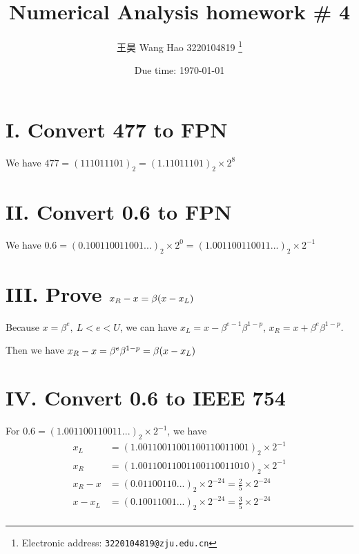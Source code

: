 \documentclass[a4paper]{article}
\begin{document}
\title{Numerical Analysis homework \# 4}

\author{王昊 Wang Hao 3220104819
  \thanks{Electronic address: \texttt{3220104819@zju.edu.cn}}}


\date{Due time: \today}

\maketitle


\section*{I. Convert 477 to FPN}

We have $477 = (111011101)_2 = (1.11011101)_2 \times 2^8$

\section*{II. Convert 0.6 to FPN}

We have $0.6 = (0.100110011001...)_2 \times 2^0 = (1.001100110011...)_2 \times 2^{-1}$

\section*{III. Prove $x_R - x = \beta \qty(x-x_L)$}

Because $x = \beta^e, ~ L<e<U$, we can have $x_L = x - \beta^{e-1} \beta^{1-p}$, $x_R = x + \beta^e \beta^{1-p}$. 

Then we have $x_R - x = \beta^e \beta^{1-p} = \beta \qty(x-x_L)$

\section*{IV. Convert 0.6 to IEEE 754}

For $0.6 = (1.001100110011...)_2 \times 2^{-1}$, we have
\begin{equation}
    \begin{aligned}
        x_L &= (1.00110011001100110011001)_2 \times 2^{-1} \\
        x_R &= (1.00110011001100110011010)_2 \times 2^{-1} \\
        x_R - x &= (0.01100110...)_2 \times 2^{-24} = \frac{2}{5} \times 2^{-24} \\
        x - x_L &= (0.10011001...)_2 \times 2^{-24} = \frac{3}{5} \times 2^{-24} \\
    \end{aligned}
\end{equation}
\end{document}
